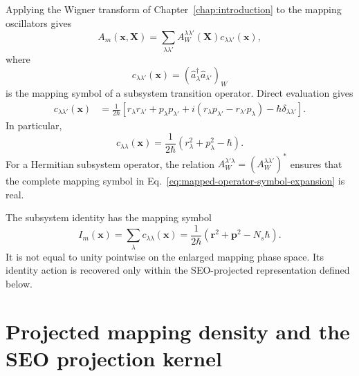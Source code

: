 \documentclass[
  11pt,
  letterpaper,
  onehalfspacing,
  normalmargins,
  equalmargins,
  oneside
]{ut-thesis}
\begin{document}
Applying the Wigner transform of Chapter~\ref{chap:introduction} to the
mapping oscillators gives
\begin{equation}
A_m(\mathbf x,\mathbf X)
=
\sum_{\lambda\lambda'}
A_W^{\lambda\lambda'}(\mathbf X)
 c_{\lambda\lambda'}(\mathbf x),
\label{eq:mapped-operator-symbol-expansion}
\end{equation}
where
\begin{equation}
c_{\lambda\lambda'}(\mathbf x)
=
\left(
\hat a_\lambda^\dagger\hat a_{\lambda'}
\right)_W
\label{eq:mapping-c-symbol-definition}
\end{equation}
is the mapping symbol of a subsystem transition operator. Direct evaluation
gives
\begin{align}
c_{\lambda\lambda'}(\mathbf x)
&=
\frac{1}{2\hbar}
\left[
 r_\lambda r_{\lambda'}
+
 p_\lambda p_{\lambda'}
+
 i\left(
 r_\lambda p_{\lambda'}
-
 r_{\lambda'}p_\lambda
\right)
-
\hbar\delta_{\lambda\lambda'}
\right].
\label{eq:mapping-c-symbol}
\end{align}
In particular,
\begin{equation}
c_{\lambda\lambda}(\mathbf x)
=
\frac{1}{2\hbar}
\left(
 r_\lambda^2+p_\lambda^2-\hbar
\right).
\label{eq:mapping-diagonal-c-symbol}
\end{equation}
For a Hermitian subsystem operator, the relation
\(A_W^{\lambda'\lambda}=(A_W^{\lambda\lambda'})^*\) ensures that the complete
mapping symbol in Eq.~\eqref{eq:mapped-operator-symbol-expansion} is real.

The subsystem identity has the mapping symbol
\begin{equation}
I_m(\mathbf x)
=
\sum_\lambda c_{\lambda\lambda}(\mathbf x)
=
\frac{1}{2\hbar}
\left(
\mathbf r^2+\mathbf p^2-N_s\hbar
\right).
\label{eq:mapping-identity-symbol}
\end{equation}
It is not equal to unity pointwise on the enlarged mapping phase space. Its
identity action is recovered only within the SEO-projected representation
defined below.


\section{Projected mapping density and the SEO projection kernel}
\label{sec:projected-mapping-density-seo}
\end{document}
